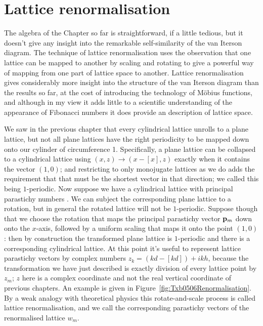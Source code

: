 \section{Lattice renormalisation}
The algebra of the Chapter so far is straightforward, if a little tedious, but it doesn't give any insight into the remarkable self-similarity of the van Iterson diagram. The technique of lattice renormalisation uses the observation that one lattice can be mapped to another by scaling and rotating to give a powerful way of mapping from one part of lattice space to another. Lattice renormalisation gives considerably more insight into the structure of the van Iterson diagram than the results so far, at the cost of introducing the technology of M{\"obius} functions, and although in my view it adds little to a scientific understanding of the appearance of Fibonacci numbers it does provide an   description of lattice space.
\label{sec:levitov}

We saw in the previous chapter that every cylindrical lattice unrolls to a plane lattice, but not all plane lattices have the right periodicity to be mapped down onto our cylinder of circumference 1. Specifically, a plane lattice can be collapsed to a cylindrical lattice using $(x,z)\rightarrow(x-\left[x\right],z)$ exactly when it contains the vector $(1,0)$; and restricting to only monojugate lattices as we do adds the requirement that that must be the shortest vector in that direction; we called this being $1$-periodic. 
Now suppose we have a cylindrical lattice with principal parastichy numbers . We can subject the corresponding plane lattice to a rotation, but in general the rotated lattice will not be $1$-periodic. Suppose though that we choose the rotation that maps the principal parastichy vector ${\mathbf p}_{m}$ down onto the $x$-axis, followed by a uniform scaling that maps it onto the point $(1,0)$: then by construction the transformed plane lattice is $1$-periodic and there is a corresponding cylindrical lattice. At this point it's useful to represent lattice parastichy vectors by complex numbers $z_k=(kd-[kd])+i kh$, because the transformation we have just described is exactly division of every lattice point by $z_m$; $z$ here is a complex coordinate and not the real vertical coordinate of previous chapters. 
 An example is given in Figure~\ref{fig:Txb0506Renormalisation}. By a weak analogy with theoretical physics this rotate-and-scale process is called lattice renormalisation, and we call the corresponding parastichy vectors of the renormalised lattice $w_m$.



